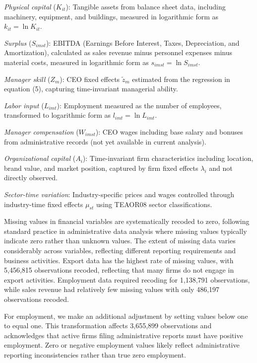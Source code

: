 \documentclass[11pt,a4paper]{article}
\begin{document}
\textit{Physical capital} ($K_{it}$): Tangible assets from balance sheet data, including machinery, equipment, and buildings, measured in logarithmic form as $k_{it} = \ln K_{it}$.

\textit{Surplus} ($S_{imst}$): EBITDA (Earnings Before Interest, Taxes, Depreciation, and Amortization), calculated as sales revenue minus personnel expenses minus material costs, measured in logarithmic form as $s_{imst} = \ln S_{imst}$.

\textit{Manager skill} ($Z_m$): CEO fixed effects $\tilde{z}_m$ estimated from the regression in equation (5), capturing time-invariant managerial ability.

\textit{Labor input} ($L_{imt}$): Employment measured as the number of employees, transformed to logarithmic form as $l_{imt} = \ln L_{imt}$.

\textit{Manager compensation} ($W_{imst}$): CEO wages including base salary and bonuses from administrative records (not yet available in current analysis).

\textit{Organizational capital} ($A_i$): Time-invariant firm characteristics including location, brand value, and market position, captured by firm fixed effects $\lambda_i$ and not directly observed.

\textit{Sector-time variation}: Industry-specific prices and wages controlled through industry-time fixed effects $\mu_{st}$ using TEAOR08 sector classifications.



Missing values in financial variables are systematically recoded to zero, following standard practice in administrative data analysis where missing values typically indicate zero rather than unknown values. The extent of missing data varies considerably across variables, reflecting different reporting requirements and business activities. Export data has the highest rate of missing values, with 5,456,815 observations recoded, reflecting that many firms do not engage in export activities. Employment data required recoding for 1,138,791 observations, while sales revenue had relatively few missing values with only 486,197 observations recoded.

For employment, we make an additional adjustment by setting values below one to equal one. This transformation affects 3,655,899 observations and acknowledges that active firms filing administrative reports must have positive employment. Zero or negative employment values likely reflect administrative reporting inconsistencies rather than true zero employment.
\end{document}
